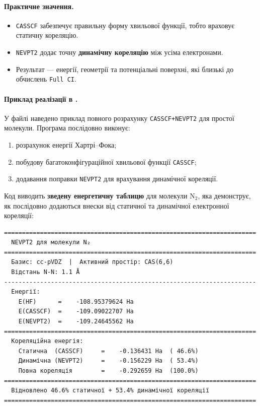 \paragraph{Практичне значення.}
\begin{itemize}
  \item \texttt{CASSCF} забезпечує правильну форму хвильової функції,
        тобто враховує статичну кореляцію.
  \item \texttt{NEVPT2} додає точну \textbf{динамічну кореляцію}
        між усіма електронами.
  \item Результат --- енергії, геометрії та потенціальні поверхні,
        які близькі до обчислень \texttt{Full CI}.
\end{itemize}

\paragraph{Приклад реалізації в \PySCF.}
У файлі  наведено приклад повного розрахунку
\texttt{CASSCF+NEVPT2} для простої молекули.
Програма послідовно виконує:
\begin{enumerate}
  \item розрахунок енергії Хартрі–Фока;
  \item побудову багатоконфігураційної хвильової функції \texttt{CASSCF};
  \item додавання поправки \texttt{NEVPT2} для врахування динамічної кореляції.
\end{enumerate}

Код виводить \textbf{зведену енергетичну таблицю} для молекули \( \mathrm{N_2} \),
яка демонструє, як послідовно додаються внески від статичної та динамічної
електронної кореляції:

\begin{verbatim}
======================================================================
  NEVPT2 для молекули N₂
======================================================================
  Базис: cc-pVDZ  |  Активний простір: CAS(6,6)
  Відстань N-N: 1.1 Å
----------------------------------------------------------------------
  Енергії:
    E(HF)      =    -108.95379624 Ha
    E(CASSCF)  =    -109.09022707 Ha
    E(NEVPT2)  =    -109.24645562 Ha
======================================================================
  Кореляційна енергія:
    Статична  (CASSCF)     =    -0.136431 Ha  ( 46.6%)
    Динамічна (NEVPT2)     =    -0.156229 Ha  ( 53.4%)
    Повна кореляція        =    -0.292659 Ha  (100.0%)
======================================================================
  Відновлено 46.6% статичної + 53.4% динамічної кореляції
======================================================================
\end{verbatim}

